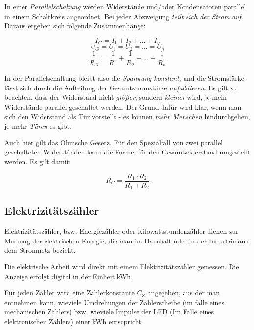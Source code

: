\documentclass[a4paper, 12pt]{report}
\begin{document}
In einer \emph{Parallelschaltung} werden Widerstände und/oder Kondensatoren
parallel in einem Schaltkreis angeordnet. Bei jeder Abzweigung \emph{teilt
sich der Strom auf}. Daraus ergeben sich folgende Zusammenhänge:

\begin{center}
    \begin{equation}
	I_G = I_1 + I_2 + \dots + I_n
    \end{equation}
    \begin{equation}
	U_G = U_1 = U_2 = \dots = U_n
    \end{equation}
    \begin{equation}
	\frac{1}{R_G} = \frac{1}{R_1} + \frac{1}{R_2} + \dots + \frac{1}{R_n}
    \end{equation}
\end{center}

In der Parallelschaltung bleibt also die \emph{Spannung konstant}, und die
Stromstärke lässt sich durch die Aufteilung der Gesamtstromstärke
\emph{aufaddieren}. Es gilt zu beachten, dass der Widerstand nicht \emph{größer},
sondern \emph{kleiner} wird, je mehr Widerstände parallel geschaltet werden.
Der Grund dafür wird klar, wenn man sich den Widerstand als Tür vorstellt - es
können \emph{mehr Menschen} hindurchgehen, je mehr \emph{Türen} es gibt.

Auch hier gilt das Ohmsche Gesetz. Für den Spezialfall von zwei parallel
geschalteten Widerständen kann die Formel für den Gesamtwiderstand umgestellt
werden. Es gilt damit:
\begin{center}
    \begin{equation}
	R_G = \frac{R_1 \cdot R_2}{R_1 + R_2}
    \end{equation}
\end{center}

\subsection{Elektrizitätszähler}

Elektrizitätszähler, bzw. Energiezähler oder Kilowattstundenzähler dienen zur
Messung der elektrischen Energie, die man im Haushalt oder in der Industrie
aus dem Stromnetz bezieht.

Die elektrische Arbeit wird direkt mit einem Elektrizitätszähler gemessen.
Die Anzeige erfolgt digital in der Einheit kWh.

Für jeden Zähler wird eine Zählerkonstante $C_Z$ angegeben, aus der man
entnehmen kann, wieviele Umdrehungen der Zählerscheibe (im falle eines
mechanischen Zählers) bzw. wieviele Impulse der LED (Im Falle eines
elektronischen Zählers) einer kWh entscpricht.
\end{document}
